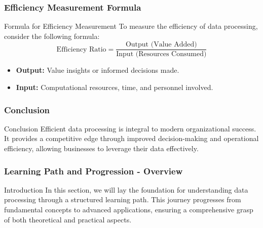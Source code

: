 \documentclass[aspectratio=169]{beamer}
\begin{document}
\begin{frame}[fragile]
    \frametitle{Efficiency Measurement Formula}
    \begin{block}{Formula for Efficiency Measurement}
        To measure the efficiency of data processing, consider the following formula:
        \begin{equation}
        \text{Efficiency Ratio} = \frac{\text{Output (Value Added)}}{\text{Input (Resources Consumed)}}
        \end{equation}
    \end{block}
    \begin{itemize}
        \item \textbf{Output:} Value insights or informed decisions made.
        \item \textbf{Input:} Computational resources, time, and personnel involved.
    \end{itemize}
\end{frame}

\begin{frame}[fragile]
    \frametitle{Conclusion}
    \begin{block}{Conclusion}
        Efficient data processing is integral to modern organizational success. It provides a competitive edge through improved decision-making and operational efficiency, allowing businesses to leverage their data effectively.
    \end{block}
\end{frame}

\begin{frame}[fragile]
    \frametitle{Learning Path and Progression - Overview}
    \begin{block}{Introduction}
        In this section, we will lay the foundation for understanding data processing through a structured learning path. 
        This journey progresses from fundamental concepts to advanced applications, ensuring a comprehensive grasp of both theoretical and practical aspects.
    \end{block}
\end{frame}
\end{document}
